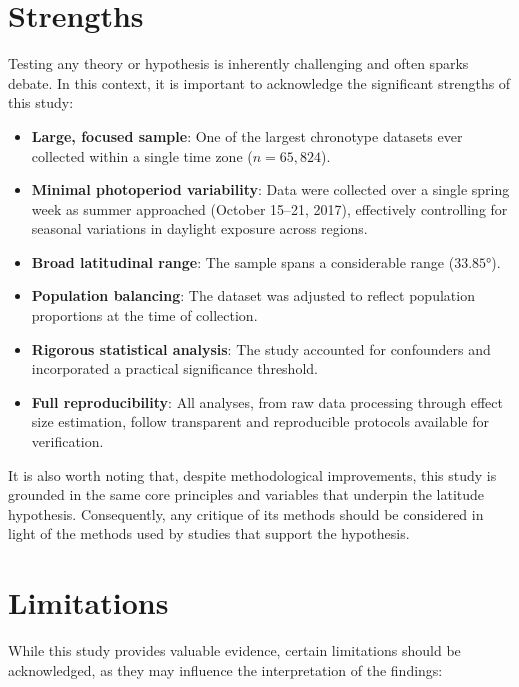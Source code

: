 \documentclass[
12pt,
openright,
oneside,
a4paper,
chapter=TITLE,
section=TITLE,
french,
spanish,
brazil,
english
]{abntex2}
\providecommand{\tightlist}{
\setlength{\itemsep}{0ex}\setlength{\parskip}{0\baselineskip}}
\begin{document}
\section{Strengths}\label{strengths}

Testing any theory or hypothesis is inherently challenging and often
sparks debate. In this context, it is important to acknowledge the
significant strengths of this study:

\begin{itemize}
\tightlist
\item
  \textbf{Large, focused sample}: One of the largest chronotype datasets
  ever collected within a single time zone (\(n = 65,824\)).
\item
  \textbf{Minimal photoperiod variability}: Data were collected over a
  single spring week as summer approached (October 15--21, 2017),
  effectively controlling for seasonal variations in daylight exposure
  across regions.
\item
  \textbf{Broad latitudinal range}: The sample spans a considerable
  range (\(33.85°\)).
\item
  \textbf{Population balancing}: The dataset was adjusted to reflect
  population proportions at the time of collection.
\item
  \textbf{Rigorous statistical analysis}: The study accounted for
  confounders and incorporated a practical significance threshold.
\item
  \textbf{Full reproducibility}: All analyses, from raw data processing
  through effect size estimation, follow transparent and reproducible
  protocols available for verification.
\end{itemize}

It is also worth noting that, despite methodological improvements, this
study is grounded in the same core principles and variables that
underpin the latitude hypothesis. Consequently, any critique of its
methods should be considered in light of the methods used by studies
that support the hypothesis.

\section{Limitations}\label{limitations}

While this study provides valuable evidence, certain limitations should
be acknowledged, as they may influence the interpretation of the
findings:
\end{document}
